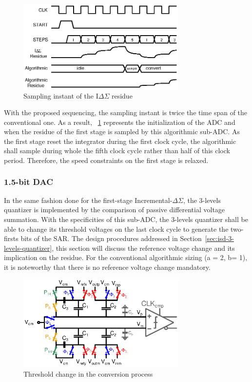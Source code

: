 \begin{figure}[htp]
	\centering
	\includegraphics[width=0.75\textwidth]{Chapter4/Figs/isd-algo-residue-sampling.ps}
	\caption{Sampling instant of the I\(\Delta \Sigma \) residue}
	\label{fig:digital-sampling}
\end{figure}

With the proposed sequencing, the sampling instant is twice the time span of the conventional one. As a result, \figurename~\ref{fig:digital-sampling} represents the initialization of the ADC and when the residue of the first stage is sampled by this algorithmic sub-ADC\@. As the first stage reset the integrator during the first clock cycle, the algorithmic shall sample during whole the fifth clock cycle rather than half of this clock period. Therefore, the speed constraints on the first stage is relaxed.

	\subsubsection{1.5-bit DAC}             %
In the same fashion done for the first-stage Incremental-\(\Delta\Sigma \), the 3-levels quantizer is implemented by the comparison of passive differential voltage summation. With the specificities of this sub-ADC, the 3-levels quantizer shall be able to change its threshold voltages on the last clock cycle to generate the two-firsts bits of the SAR\@. The design procedures addressed in Section~\ref{sec:isd-3-levels-quantizer}, this section will discuss the reference voltage change and its implication on the residue. For the conventional algorithmic sizing (a = 2, b= 1), it is noteworthy that there is no reference voltage change mandatory.

\begin{figure}[htp]
	\centering
	\includegraphics[width=0.75\textwidth]{Chapter4/Figs/algo-passive-adder-comp.ps}
	\caption{Threshold change in the conversion process}
	\label{fig:thresholds-generator}
\end{figure}

